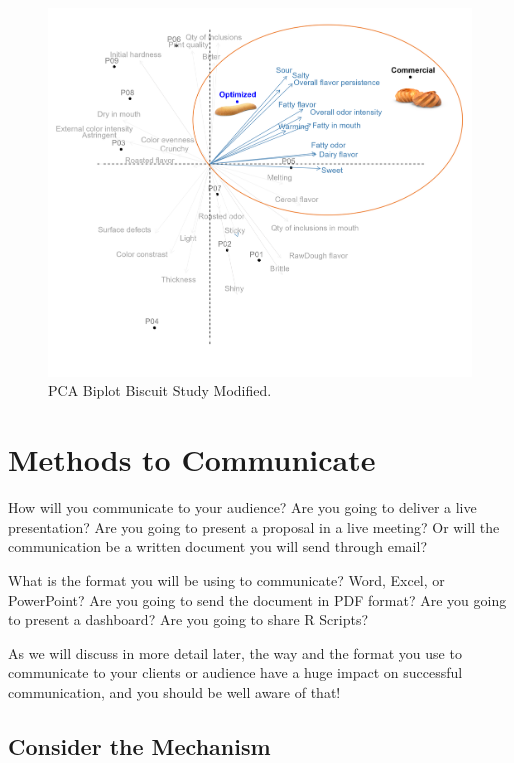 \documentclass[
]{krantz}
\begin{document}
\begin{figure}

{\centering \includegraphics[width=0.9\linewidth]{images/PCA_management} 

}

\caption{PCA Biplot Biscuit Study Modified.}\label{fig:pcamanagement}
\end{figure}

\hypertarget{methods-to-communicate}{%
\section{Methods to Communicate}\label{methods-to-communicate}}

How will you communicate to your audience? Are you going to deliver a live presentation? Are you going to present a proposal in a live meeting? Or will the communication be a written document you will send through email?

What is the format you will be using to communicate? Word, Excel, or PowerPoint? Are you going to send the document in PDF format? Are you going to present a dashboard? Are you going to share R Scripts?

As we will discuss in more detail later, the way and the format you use to communicate to your clients or audience have a huge impact on successful communication, and you should be well aware of that!

\hypertarget{consider-the-mechanism}{%
\subsection{Consider the Mechanism}\label{consider-the-mechanism}}
\end{document}
